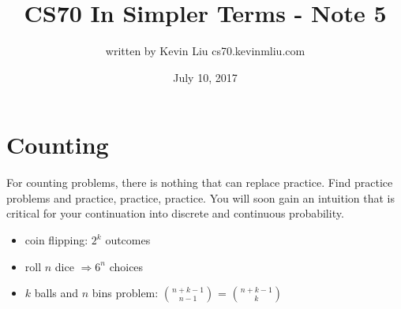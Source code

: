 \documentclass[a4paper]{article}
\title{CS70 In Simpler Terms - Note 5}
\author{written by Kevin Liu cs70.kevinmliu.com}
\date{July 10, 2017}
\begin{document}
\maketitle

\section{Counting}
For counting problems, there is nothing that can replace practice. Find practice problems and practice, practice, practice. You will soon gain an intuition that is critical for your continuation into discrete and continuous probability. 
\begin{itemize}
    \item coin flipping: $2^k$ outcomes
    \item roll $n$ dice $\Rightarrow 6^n$ choices
    \item $k$ balls and $n$ bins problem: $n+k-1 \choose n-1$ = $n+k-1 \choose k$

\end{itemize}
\end{document}
